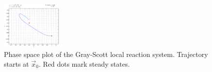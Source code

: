 \begin{figure}
\centering
\includegraphics[trim = 5mm 25mm 20mm 5mm, clip, width=3cm,width=\textwidth]{images/phasespace.eps}
\caption{Phase space plot of the Gray-Scott local reaction system. Trajectory starts at $\vec{x}_0$. Red dots mark steady states. }
\label{fig:phasespace}
\end{figure}

